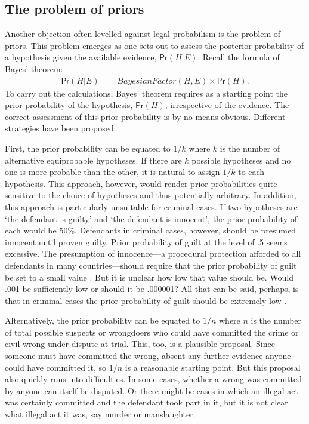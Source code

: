 \documentclass{article}
\newcommand{\pr}{\mathsf{Pr}}
\begin{document}
\subsection{The problem of priors}
\label{subsec:prior}


Another  objection often levelled against legal probabilism is 
the problem of priors.
This problem emerges as one sets out to assess the posterior probability of a hypothesis given the available evidence, $\pr(H \vert E)$. Recall the formula of Bayes' theorem:  %
\begin{align*} \pr(H \vert E) & =\textit{BayesianFactor}(H, E) \times \pr(H).\end{align*}
To carry out the calculations, Bayes' theorem requires  as a starting point the prior probability of the hypothesis, $\pr(H)$, irrespective of the evidence. The correct assessment of this prior probability is by no means obvious. 
Different strategies have been proposed. 

First, the prior probability can be equated to $1/k$ where $k$ is the number of alternative equiprobable hypotheses. If there are $k$ possible hypotheses and no one is more probable than the other, it is natural to assign $1/k$ to each hypothesis.  
This approach, however, would render prior probabilities quite sensitive to the choice of hypotheses and thus potentially arbitrary.  In addition, this approach is particularly unsuitable for criminal cases. If two hypotheses are `the defendant is guilty' and `the defendant is innocent', the prior probability  of each would be 50\%. 
Defendants in criminal cases, however, should be presumed innocent until proven guilty.  Prior probability of guilt at the level of .5 seems excessive. 
The presumption of innocence---a procedural protection afforded to all defendants in many countries---should require that the prior probability of guilt be set to a small value \citep{friedmanEtAl1995}.  But it is unclear how low that value should be. Would .001 be sufficiently low or should it be .000001?
All that can be said, perhaps, is that in criminal cases the prior probability of guilt should be extremely low \citep{Friedman2000}. 



Alternatively, the prior probability can be equated to $1/n$ where $n$ is the number of total possible suspects or wrongdoers who could have committed the crime or civil wrong under dispute at trial. This, too, is a plausible proposal. Since someone must have committed the wrong, absent any further evidence anyone could have committed it, so $1/n$ is a reasonable starting point. But  this proposal also quickly runs into difficulties. In some cases, whether a wrong was committed by anyone can itself be disputed. Or there might be cases in which an illegal act was certainly committed and the  defendant took part in it, but it is not clear what illegal act it was, say murder or manslaughter. 
\end{document}
